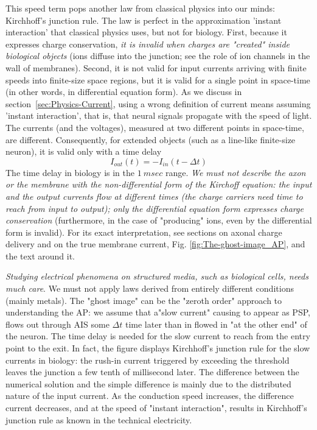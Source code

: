 {This speed term pops another law from classical physics into our minds:
Kirchhoff's junction rule. The law is perfect in the approximation
'instant interaction' that classical
physics uses, but not for biology.
First, because it expresses charge conservation, \textit{it
is invalid when charges are "created" inside biological objects}
(ions diffuse into the junction; see the role of ion channels in the
wall of membranes). Second, it is not valid for input currents arriving
with finite speeds into finite-size space regions, but it is valid for a single point in space-time
(in other words, in differential equation form). 
As we discuss in section~\ref{sec:Physics-Current},
using a wrong definition of current means assuming 'instant interaction', that is, that neural signals propagate with the speed of light.
The currents (and
the voltages), measured at two different points in space-time, are
different. Consequently, for extended objects (such as a line-like finite-size
neuron), it is valid only with a time delay
%
\begin{equation}
I_{out}(t)=-I_{in}(t-\Delta t)\label{eq:Kirchoff_biology}
\end{equation}
%
The time delay in biology is in the $1\ msec$
range.
\textit{We must not describe the axon or the membrane with the non-differential form of the Kirchoff equation:
the input and the output currents flow at different times (the charge carriers need time to reach from input to output); only the differential
equation form expresses charge conservation} (furthermore, in the case of "producing" ions, even by the differential form is invalid).
For its exact interpretation, see sections on
{axonal charge delivery}
and on the
{true membrane current}, Fig. \ref{fig:The-ghost-image_AP},
and the text around it.

\textit{Studying electrical phenomena on structured
media, such as biological cells, needs much care}. We must not apply
laws derived from entirely different conditions (mainly metals).
The "ghost image" can be the "zeroth order" approach to understanding
the \gls{AP}: we assume that a"slow current" causing to appear as  \gls{PSP}, flows out through \gls{AIS} some $\Delta t$ time later 
than in flowed in "at the other end" of the neuron.
The time delay is needed for the slow current 
to reach from  the entry point to the exit.
In fact, the figure displays Kirchhoff's junction rule for 
the slow currents in biology: the rush-in current 
triggered by exceeding the threshold leaves the junction
a few tenth of millisecond later.
The difference between the numerical solution and the 
simple difference is mainly due to the distributed nature 
of the input current. As the conduction speed increases,
the difference current decreases, and at the speed of "instant 
interaction", results in Kirchhoff's junction rule as 
known in the technical electricity.
}

